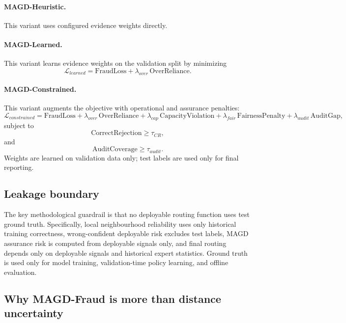 \paragraph{MAGD-Heuristic.}
This variant uses configured evidence weights directly.

\paragraph{MAGD-Learned.}
This variant learns evidence weights on the validation split by minimizing
\begin{equation}
\mathcal{L}_{learned} = \text{FraudLoss} + \lambda_{over}\,\text{OverReliance}.
\end{equation}

\paragraph{MAGD-Constrained.}
This variant augments the objective with operational and assurance penalties:
\begin{equation}
\mathcal{L}_{constrained} =
\text{FraudLoss}
+ \lambda_{over}\,\text{OverReliance}
+ \lambda_{cap}\,\text{CapacityViolation}
+ \lambda_{fair}\,\text{FairnessPenalty}
+ \lambda_{audit}\,\text{AuditGap},
\end{equation}
subject to
\begin{equation}
\text{CorrectRejection} \ge \tau_{CR},
\end{equation}
and
\begin{equation}
\text{AuditCoverage} \ge \tau_{audit}.
\end{equation}
Weights are learned on validation data only; test labels are used only for final reporting.

\subsection{Leakage boundary}

The key methodological guardrail is that no deployable routing function uses test ground truth. Specifically, local neighbourhood reliability uses only historical training correctness, wrong-confident deployable risk excludes test labels, MAGD assurance risk is computed from deployable signals only, and final routing depends only on deployable signals and historical expert statistics. Ground truth is used only for model training, validation-time policy learning, and offline evaluation.

\subsection{Why MAGD-Fraud is more than distance uncertainty}


